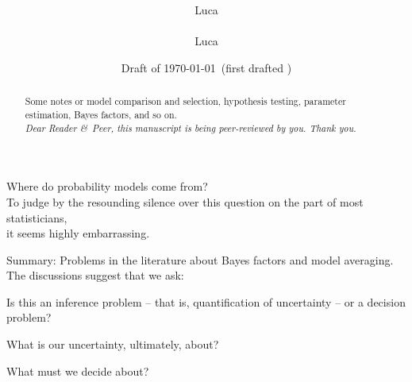 \documentclass[\ifafour a4paper,12pt,\else a5paper,10pt,\fi%
onecolumn,oneside,article,%
british%
]{memoir}
\title{\propertitle%
}
\author{%
\ifpublic%
\hspace*{\stretch{1}}%
\parbox{0.5\linewidth}%
{\protect\centering Luca\\%
\footnotesize\epost{\email{piero.mana}{ntnu.no}}}%
\hspace*{\stretch{1}}%
\else%
Luca\\{\footnotesize\epost{\email{piero.mana}{ntnu.no}}%
}\fi%
}
\date{Draft of \today\ (first drafted \firstdraft)}
\theoremstyle{remark}
\theoremstyle{innote}
\newcommand*{\citep}{\parencites}
\newcommand*{\amp}{\&}
\newcommand*{\asudedication}[1]{%
{\par\centering\textit{#1}\par}}
\renewcommand*{\|}{\mathpunct{|}}
\begin{document}
\captiondelim{\quad}\captionnamefont{\footnotesize}\captiontitlefont{\footnotesize}
\frenchspacing

\maketitle
\ifpublic
\abstractrunin
\abslabeldelim{}
\renewcommand*{\abstractname}{}
\setlength{\absleftindent}{0pt}
\setlength{\absrightindent}{0pt}
\setlength{\abstitleskip}{-\absparindent}
\begin{abstract}%
  \noindent Some notes or model comparison and selection, hypothesis
  testing, parameter estimation, Bayes factors, and so on.
  \\\noindent\emph{\footnotesize Dear Reader \amp\ Peer, this manuscript is
    being peer-reviewed by you. Thank you.}
\end{abstract}\fi

\frenchspacing


 \setlength{\epigraphwidth}{.5\columnwidth}
 \epigraphfontsize{\footnotesize}
 \setlength{\epigraphrule}{0pt}
 \epigraph{Where do probability models come from?\\ To judge by the resounding
  silence over this question on the part of most statisticians,\\ it seems
  highly embarrassing.}{\citep[p.~220]{dawid1982}}


Summary: Problems in the literature about Bayes factors and model
averaging. The discussions suggest that we ask:
\begin{enumerate*}[(\arabic*)]
\item Is this an inference problem -- that is, quantification of
  uncertainty -- or a decision problem?
\item What is our uncertainty, ultimately, about?
\item What must we decide about?
\end{enumerate*}
\end{document}
